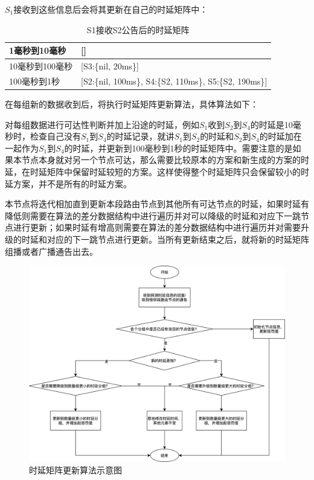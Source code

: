 $S_1$接收到这些信息后会将其更新在自己的时延矩阵中：

\begin{table}[htbp]
\begin{tabular}{|p{}|p{}|}\hline
1毫秒到10毫秒 & {[}{]} \\ \hline
10毫秒到100毫秒 & {[}S3:\{nil, 20ms\}{]} \\ \hline
100毫秒到1秒 & {[}S2:\{nil, 100ms\}, S4:\{S2, 110ms\}, S5:\{S2, 190ms\}{]} \\ \hline
\end{tabular}
\caption{S1接收S2公告后的时延矩阵}
\label{table-S1-after-S2}
\end{table}

在每组新的数据收到后，将执行时延矩阵更新算法，具体算法如下：

对每组数据进行可达性判断并加上沿途的时延，例如$S_1$收到$S_2$到$S_4$的时延是10毫秒时，检查自己没有$S_1$到$S_4$的时延记录，就讲$S_1$到$S_2$的时延和$S_2$到$S_4$的时延加在一起作为$S_1$到$S_4$的时延，并更新到100毫秒到1秒的时延矩阵中。需要注意的是如果本节点本身就对另一个节点可达，那么需要比较原本的方案和新生成的方案的时延，在时延矩阵中保留时延较短的方案。这样使得整个时延矩阵只会保留较小的时延方案，并不是所有的时延方案。

本节点将迭代相加直到更新本段路由节点到其他所有可达节点的时延，如果时延有降低则需要在算法的差分数据结构中进行遍历并对可以降级的时延和对应下一跳节点进行更新；如果时延有增高则需要在算法的差分数据结构中进行遍历并对需要升级的时延和对应的下一跳节点进行更新。当所有更新结束之后，就将新的时延矩阵组播或者广播通告出去。

\begin{figure}[htbp]
\setlength{\abovecaptionskip}{15pt plus 3pt minus 2pt}
\centerline{\includegraphics[width=1\textwidth]{./figures/ch4-sr-update.png}}
\caption{时延矩阵更新算法示意图}
\label{fig-ch4-sr-update}
\end{figure}

